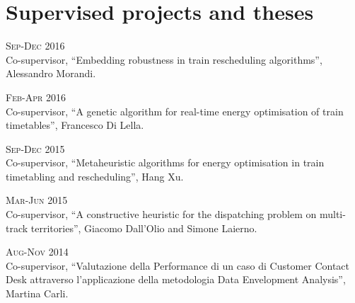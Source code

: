\section*{Supervised projects and theses}

\begin{paracol}{2}
  \textsc{Sep-Dec 2016}
\switchcolumn
  \\
  Co-supervisor, ``Embedding robustness in train rescheduling algorithms'', Alessandro Morandi.
\end{paracol}

\begin{paracol}{2}
  \textsc{Feb-Apr 2016}
\switchcolumn
  \\
  Co-supervisor, ``A genetic algorithm for real-time energy optimisation of train timetables'', Francesco Di Lella.
\end{paracol}

\begin{paracol}{2}
  \textsc{Sep-Dec 2015}
\switchcolumn
  \\
  Co-supervisor, ``Metaheuristic algorithms for energy optimisation in train timetabling and rescheduling'', Hang Xu.
\end{paracol}

\begin{paracol}{2}
  \textsc{Mar-Jun 2015}
\switchcolumn
  \\
  Co-supervisor, ``A constructive heuristic for the dispatching problem on multi-track territories'', Giacomo Dall'Olio and Simone Laierno.
\end{paracol}

\begin{paracol}{2}
  \textsc{Aug-Nov 2014}
\switchcolumn
  \\
  Co-supervisor, ``Valutazione della Performance di un caso di Customer Contact Desk attraverso l'applicazione della metodologia Data Envelopment Analysis'', Martina Carli.
\end{paracol}
